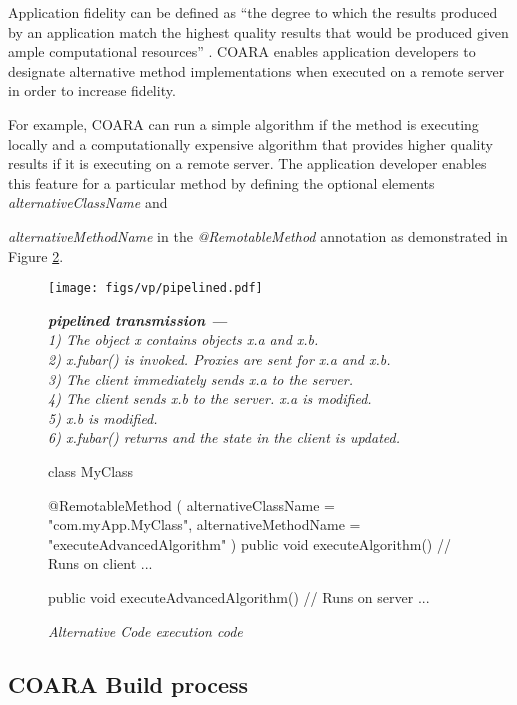 \documentclass[10pt,journal,cspaper,compsoc]{IEEEtran}
\begin{document}
Application fidelity can be defined as ``the degree to which the results produced by an application match the highest quality results that would be produced given ample computational resources'' \cite{Flinn:2012ws}. COARA enables application developers to designate alternative method implementations when executed on a remote server in order to increase fidelity.

For example, COARA can run a simple algorithm if the method is executing locally and a computationally expensive algorithm that provides higher quality results if it is executing on a remote server.  The application developer enables this feature for a particular method by defining the optional elements \emph{alternativeClassName} and {\emph{alternativeMethodName} in the \emph{@RemotableMethod} annotation as demonstrated in Figure \ref{fig:alt}.

\begin{figure}
\texttt{[image: figs/vp/pipelined.pdf]}
\captionsetup{width=9cm}
\caption{\small\textsl{\textbf{pipelined transmission ---} \\
 1) The object x contains objects x.a and x.b.\\
 2) x.fubar() is invoked.  Proxies are sent for x.a and x.b.\\
 3) The client immediately sends x.a to the server.\\
 4) The client sends x.b to the server. x.a is modified.\\
 5) x.b is modified.\\
 6) x.fubar() returns and the state in the client is updated.}}
\label{fig:pipelined}
\end{figure}


\begin{figure}
\begin{code}[language=Java]
class MyClass{
  @RemotableMethod (
    alternativeClassName = "com.myApp.MyClass",
    alternativeMethodName = "executeAdvancedAlgorithm"
  )
  public void executeAlgorithm() // Runs on client
    { ... }

  public void executeAdvancedAlgorithm() // Runs on server
    { ... }
}
\end{code}
\caption{\small\textsl{Alternative Code execution code}}
\label{fig:alt}
\end{figure}


\subsection{COARA Build process \label{section.build}}


}
\end{document}
